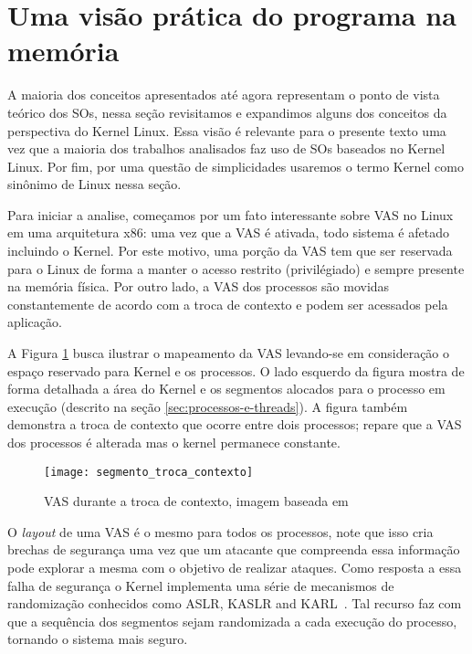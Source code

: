 \section{Uma visão prática do programa na memória}

A maioria dos conceitos apresentados até agora representam o ponto de vista
teórico dos SOs, nessa seção revisitamos e expandimos alguns dos conceitos da
perspectiva do Kernel Linux. Essa visão é relevante para o presente texto uma
vez que a maioria dos trabalhos analisados faz uso de SOs baseados no Kernel
Linux. Por fim, por uma questão de simplicidades usaremos o termo Kernel como
sinônimo de Linux nessa seção.

Para iniciar a analise, começamos por um fato interessante sobre VAS no Linux
em uma arquitetura x86: uma vez que a VAS é ativada, todo sistema é afetado
incluindo o Kernel. Por este motivo, uma porção da VAS tem que ser reservada
para o Linux de forma a manter o acesso restrito (privilégiado) e sempre
presente na memória física. Por outro lado, a VAS dos processos são movidas
constantemente de acordo com a troca de contexto e podem ser acessados pela
aplicação.

A Figura \ref{fig:vas_contexto} busca ilustrar o mapeamento da VAS levando-se
em consideração o espaço reservado para Kernel e os processos. O lado esquerdo
da figura mostra de forma detalhada a área do Kernel e os segmentos alocados
para o processo em execução (descrito na seção \ref{sec:processos-e-threads}).
A figura também demonstra a troca de contexto que ocorre entre dois processos;
repare que a VAS dos processos é alterada mas o kernel permanece constante.

\begin{figure}[!h]
  \centering
  \texttt{[image: segmento\_troca\_contexto]}
  \caption{VAS durante a troca de contexto, imagem baseada em \citep{kernel_manages_memory}}
  \label{fig:vas_contexto}
\end{figure}

O \textit{layout} de uma VAS é o mesmo para todos os processos, note que isso
cria brechas de segurança uma vez que um atacante que compreenda essa informação
pode explorar a mesma com o objetivo de realizar ataques. Como resposta a essa
falha de segurança o Kernel implementa uma série de mecanismos de randomização
conhecidos como ASLR, KASLR and KARL~\citep{aslr, kaslr}. Tal recurso faz com
que a sequência dos segmentos sejam randomizada a cada execução do processo,
tornando o sistema mais seguro.

